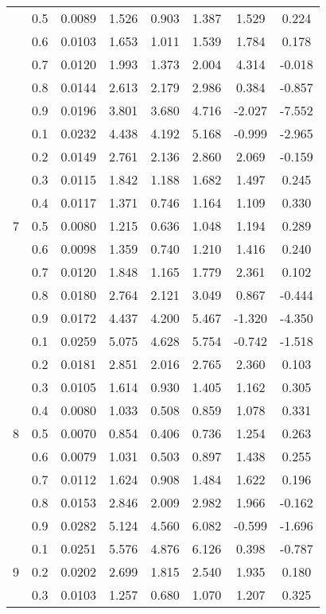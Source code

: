 \documentclass[11pt,a4paper]{report}
\begin{document}
\begin{longtable}{ | c | c || c | c | c | c | c | c | }
 & 0.5 & 0.0089 & 1.526 & 0.903 & 1.387 & 1.529 & 0.224 \\
 & 0.6 & 0.0103 & 1.653 & 1.011 & 1.539 & 1.784 & 0.178 \\
 & 0.7 & 0.0120 & 1.993 & 1.373 & 2.004 & 4.314 & -0.018 \\
 & 0.8 & 0.0144 & 2.613 & 2.179 & 2.986 & 0.384 & -0.857 \\
 & 0.9 & 0.0196 & 3.801 & 3.680 & 4.716 & -2.027 & -7.552 \\
 \hline
\multirow{9}{*}{7} & 0.1 & 0.0232 & 4.438 & 4.192 & 5.168 & -0.999 & -2.965 \\
 & 0.2 & 0.0149 & 2.761 & 2.136 & 2.860 & 2.069 & -0.159 \\
 & 0.3 & 0.0115 & 1.842 & 1.188 & 1.682 & 1.497 & 0.245 \\
 & 0.4 & 0.0117 & 1.371 & 0.746 & 1.164 & 1.109 & 0.330 \\
 & 0.5 & 0.0080 & 1.215 & 0.636 & 1.048 & 1.194 & 0.289 \\
 & 0.6 & 0.0098 & 1.359 & 0.740 & 1.210 & 1.416 & 0.240 \\
 & 0.7 & 0.0120 & 1.848 & 1.165 & 1.779 & 2.361 & 0.102 \\
 & 0.8 & 0.0180 & 2.764 & 2.121 & 3.049 & 0.867 & -0.444 \\
 & 0.9 & 0.0172 & 4.437 & 4.200 & 5.467 & -1.320 & -4.350 \\
 \hline
\multirow{9}{*}{8} & 0.1 & 0.0259 & 5.075 & 4.628 & 5.754 & -0.742 & -1.518 \\
 & 0.2 & 0.0181 & 2.851 & 2.016 & 2.765 & 2.360 & 0.103 \\
 & 0.3 & 0.0105 & 1.614 & 0.930 & 1.405 & 1.162 & 0.305 \\
 & 0.4 & 0.0080 & 1.033 & 0.508 & 0.859 & 1.078 & 0.331 \\
 & 0.5 & 0.0070 & 0.854 & 0.406 & 0.736 & 1.254 & 0.263 \\
 & 0.6 & 0.0079 & 1.031 & 0.503 & 0.897 & 1.438 & 0.255 \\
 & 0.7 & 0.0112 & 1.624 & 0.908 & 1.484 & 1.622 & 0.196 \\
 & 0.8 & 0.0153 & 2.846 & 2.009 & 2.982 & 1.966 & -0.162 \\
 & 0.9 & 0.0282 & 5.124 & 4.560 & 6.082 & -0.599 & -1.696 \\
 \hline
\multirow{9}{*}{9} & 0.1 & 0.0251 & 5.576 & 4.876 & 6.126 & 0.398 & -0.787 \\
 & 0.2 & 0.0202 & 2.699 & 1.815 & 2.540 & 1.935 & 0.180 \\
 & 0.3 & 0.0103 & 1.257 & 0.680 & 1.070 & 1.207 & 0.325 \\

\end{longtable}
\end{document}

